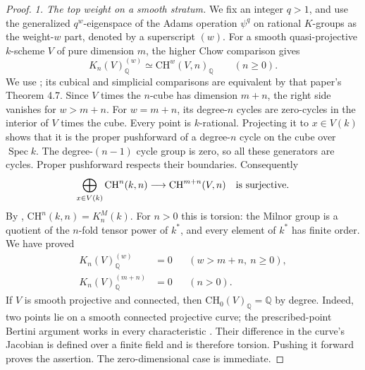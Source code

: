 \begin{proof}
\emph{1. The top weight on a smooth stratum.}
We fix an integer \(q>1\), and use the generalized \(q^w\)-eigenspace
of the Adams operation \(\psi^q\) on rational \(K\)-groups as the
weight-\(w\) part, denoted by a superscript \((w)\).
For a smooth quasi-projective \(k\)-scheme \(V\) of pure dimension
\(m\), the higher Chow comparison gives
\[
                  K_n(V)_{\mathbb Q}^{(w)}
                    \simeq\mathrm{CH}^{w}(V,n)_{\mathbb Q}
                         \qquad(n\geq0).
\]
We use \citet[Theorem 3.1, pp.~276--278]{frC3bcLevine1994};
its cubical and simplicial comparisons are equivalent by that
paper's Theorem 4.7.
Since \(V\) times the \(n\)-cube has dimension \(m+n\), the right
side vanishes for \(w>m+n\).
For \(w=m+n\), its degree-\(n\) cycles are zero-cycles in the
interior of \(V\) times the cube. Every point is \(k\)-rational.
Projecting it to \(x\in V(k)\) shows that it is the proper
pushforward of a degree-\(n\) cycle on the cube over
\(\operatorname{Spec}k\). The degree-\((n-1)\) cycle group is
zero, so all these generators are cycles. Proper pushforward
respects their boundaries. Consequently
\[
 \bigoplus_{x\in V(k)}\mathrm{CH}^{n}(k,n)
        \longrightarrow\mathrm{CH}^{m+n}(V,n)
                   \quad\hbox{is surjective}.
\]
By \citet[Theorem 1, p.~181]{frC3bcTotaro1992},
\(\mathrm{CH}^{n}(k,n)=K_n^M(k)\).
For \(n>0\) this is torsion: the Milnor group is a quotient of
the \(n\)-fold tensor power of \(k^*\), and every element of
\(k^*\) has finite order. We have proved
\begin{equation}\label{eq:C3bc-smooth-weights}
 \begin{aligned}
 K_n(V)_{\mathbb Q}^{(w)}&=0
                 &&(w>m+n,\ n\geq0),\\
 K_n(V)_{\mathbb Q}^{(m+n)}&=0
                 &&(n>0).
 \end{aligned}
\end{equation}
If \(V\) is smooth projective and connected, then
\(\mathrm{CH}_0(V)_{\mathbb Q}=\mathbb Q\) by degree.
Indeed, two points lie on a smooth connected projective curve;
the prescribed-point Bertini argument works in every characteristic
\citep[Lemma 45.8.3, proof]{frC3azStacksBertini}.
Their difference in the curve's Jacobian is defined over a finite
field and is therefore torsion. Pushing it forward proves the
assertion. The zero-dimensional case is immediate.


\end{proof}
